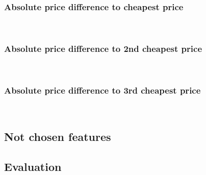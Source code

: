 \subsubsection{Absolute price difference to cheapest price}
	~\\
\subsubsection{Absolute price difference to 2nd cheapest price}
	~\\
\subsubsection{Absolute price difference to 3rd cheapest price}
	~\\
\subsection{Not chosen features}
\subsection{Evaluation}
